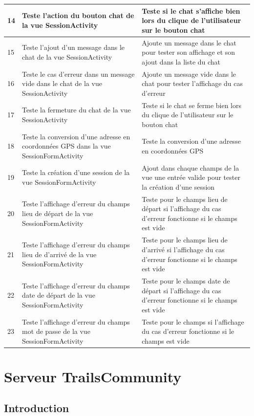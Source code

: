 \documentclass[titlepage, 12pt]{report}
\begin{document}
\begin{tabularx}{\textwidth}{|X|X|X|}
	\hline
	14 & Teste l'action du bouton chat de la vue SessionActivity & Teste si le chat s'affiche bien lors du clique de l'utilisateur sur le bouton chat  \\
	\hline
	15 & Teste l'ajout d'un message dans le chat de la vue SessionActivity & Ajoute un message dans le chat pour tester son affichage et son ajout dans la liste du chat  \\
	\hline
	16 & Teste le cas d'erreur dans un message vide dans le chat de la vue SessionActivity & Ajoute un message vide dans le chat pour tester l'affichage du cas d'erreur  \\
	\hline
	17 & Teste la fermeture du chat de la vue SessionActivity & Teste si le chat se ferme bien lors du clique de l'utilisateur sur le bouton chat  \\
	\hline
	18 & Teste la conversion d'une adresse en coordonnées GPS dans la vue SessionFormActivity & Teste la conversion d'une adresse en coordonnées GPS  \\
	\hline
	19 & Teste la création d'une session de la vue SessionFormActivity & Ajout dans chaque champs de la vue une entrée valide pour tester la création d'une session  \\
	\hline
	20 & Teste l'affichage d'erreur du champs lieu de départ de la vue SessionFormActivity & Teste pour le champs lieu de départ si l'affichage du cas d'erreur fonctionne si le champs est vide \\
	\hline
	21 & Teste l'affichage d'erreur du champs lieu de d'arrivé de la vue SessionFormActivity & Teste pour le champs lieu de d'arrivé si l'affichage du cas d'erreur fonctionne si le champs est vide \\
	\hline
	22 & Teste l'affichage d'erreur du champs date de départ de la vue SessionFormActivity & Teste pour le champs date de départ si l'affichage du cas d'erreur fonctionne si le champs est vide \\
	\hline
	23 & Teste l'affichage d'erreur du champs mot de passe de la vue SessionFormActivity & Teste pour le champs  si l'affichage du cas d'erreur fonctionne si le champs est vide \\
	\hline \hline
\end{tabularx}

\part{Serveur TrailsCommunity}

\chapter{Introduction}
\end{document}

